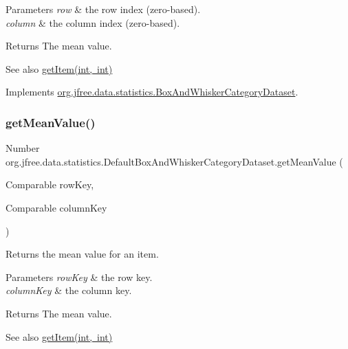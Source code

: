 \begin{DoxyParams}{Parameters}
{\em row} & the row index (zero-\/based). \\
\hline
{\em column} & the column index (zero-\/based).\\
\hline
\end{DoxyParams}
\begin{DoxyReturn}{Returns}
The mean value.
\end{DoxyReturn}
\begin{DoxySeeAlso}{See also}
\mbox{\hyperlink{classorg_1_1jfree_1_1data_1_1statistics_1_1_default_box_and_whisker_category_dataset_a85c944b06e4337059ea728b3a744e2a9}{get\+Item(int, int)}} 
\end{DoxySeeAlso}


Implements \mbox{\hyperlink{interfaceorg_1_1jfree_1_1data_1_1statistics_1_1_box_and_whisker_category_dataset_ab4be217901318f28508faad8c6e61a2c}{org.\+jfree.\+data.\+statistics.\+Box\+And\+Whisker\+Category\+Dataset}}.

\mbox{\label{classorg_1_1jfree_1_1data_1_1statistics_1_1_default_box_and_whisker_category_dataset_ae7121e3be6e26ded88ea1fdf5e4a55d0}} 
\subsubsection{\texorpdfstring{get\+Mean\+Value()}{getMeanValue()}\hspace{0.1cm}{\footnotesize\ttfamily [2/2]}}
{\footnotesize\ttfamily Number org.\+jfree.\+data.\+statistics.\+Default\+Box\+And\+Whisker\+Category\+Dataset.\+get\+Mean\+Value (\begin{DoxyParamCaption}\item[{Comparable}]{row\+Key,  }\item[{Comparable}]{column\+Key }\end{DoxyParamCaption})}

Returns the mean value for an item.


\begin{DoxyParams}{Parameters}
{\em row\+Key} & the row key. \\
\hline
{\em column\+Key} & the column key.\\
\hline
\end{DoxyParams}
\begin{DoxyReturn}{Returns}
The mean value.
\end{DoxyReturn}
\begin{DoxySeeAlso}{See also}
\mbox{\hyperlink{classorg_1_1jfree_1_1data_1_1statistics_1_1_default_box_and_whisker_category_dataset_a85c944b06e4337059ea728b3a744e2a9}{get\+Item(int, int)}} 
\end{DoxySeeAlso}


